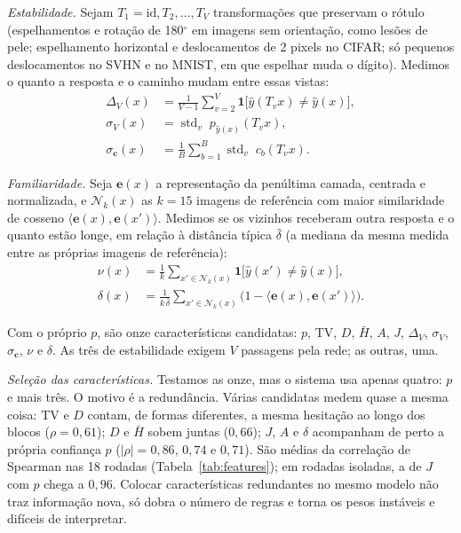 \documentclass[conference,a4paper]{IEEEtran}
\begin{document}
\textit{Estabilidade.}
Sejam $T_1 = \mathrm{id}, T_2, \dots, T_V$ transformações que preservam o rótulo (espelhamentos e rotação de 180$^\circ$ em imagens sem
orientação, como lesões de pele; espelhamento horizontal e deslocamentos de 2 pixels no CIFAR; só pequenos deslocamentos no SVHN e no MNIST,
em que espelhar muda o dígito). Medimos o quanto a resposta e o caminho mudam entre essas vistas:
\begin{align}
  \Delta_V(x) &= \frac{1}{V-1}\sum_{v=2}^{V} \mathbf{1}\big[\hat y(T_v x) \ne \hat y(x)\big], \\
  \sigma_V(x) &= \operatorname{std}_{v}\; p_{\hat y(x)}(T_v x), \\
  \sigma_{\mathbf c}(x) &= \frac{1}{B}\sum_{b=1}^{B} \operatorname{std}_{v}\; c_b(T_v x).
\end{align}

\textit{Familiaridade.}
Seja $\mathbf{e}(x)$ a representação da penúltima camada, centrada e normalizada, e $\mathcal{N}_k(x)$ as $k=15$ imagens de referência com
maior similaridade de cosseno $\langle \mathbf{e}(x), \mathbf{e}(x') \rangle$. Medimos se os vizinhos receberam outra resposta e o quanto
estão longe, em relação à distância típica $\bar\delta$ (a mediana da mesma medida entre as próprias imagens de referência):
\begin{align}
  \nu(x) &= \frac{1}{k}\sum_{x' \in \mathcal{N}_k(x)} \mathbf{1}\big[\hat y(x') \ne \hat y(x)\big], \\
  \delta(x) &= \frac{1}{k\,\bar\delta}\sum_{x' \in \mathcal{N}_k(x)} \big(1 - \langle \mathbf{e}(x), \mathbf{e}(x') \rangle\big).
\end{align}

Com o próprio $p$, são onze características candidatas: $p$, $\mathrm{TV}$, $D$, $\bar H$, $A$, $J$, $\Delta_V$, $\sigma_V$, $\sigma_{\mathbf c}$,
$\nu$ e $\delta$. As três de estabilidade exigem $V$ passagens pela rede; as outras, uma.

\emph{Seleção das características.} Testamos as onze, mas o sistema usa apenas quatro: $p$ e mais três.
O motivo é a redundância. Várias candidatas medem quase a mesma coisa: $\mathrm{TV}$ e $D$ contam,
de formas diferentes, a mesma hesitação ao longo dos blocos ($\rho = 0{,}61$); $D$ e $\bar H$ sobem juntas ($0{,}66$);
$J$, $A$ e $\delta$ acompanham de perto a própria confiança $p$ ($|\rho| = 0{,}86$, $0{,}74$ e $0{,}71$). São médias da
correlação de Spearman nas 18 rodadas (Tabela~\ref{tab:features}); em rodadas isoladas, a de $J$ com $p$ chega a $0{,}96$. Colocar características redundantes
no mesmo modelo não traz informação nova, só dobra o número de regras e torna os pesos instáveis
e difíceis de interpretar.
\end{document}
